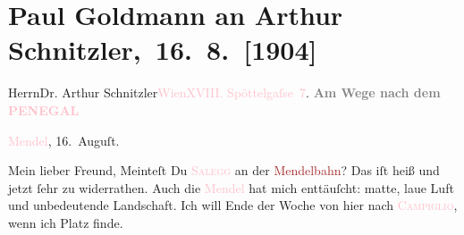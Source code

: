 

\renewcommand{\erwaehntePersonen}{Personen: Olga Schnitzler}
\renewcommand{\erwaehnteInstitutionen}{Institutionen: Mendelbahn}
\renewcommand{\erwaehnteOrte}{Orte: Edmund-Weiß-Gasse, Hotel Salegg, Madonna di Campiglio, Mende, Monte Penegal, Wien}
\renewcommand{\erwaehnteWerke}{}
\section[ Paul Goldmann an Arthur Schnitzler, 16. 8. {[}1904{]}]{Paul Goldmann an Arthur Schnitzler, 16. 8. {[}1904{]}}
\nopagebreak{}
\rehead{ }\normalsize\beginnumbering{}
\toendnotes[C]{\smallbreak\pagebreak[2]}
\toendnotes[C]{\smallbreak}\pstart{}{\pb}Herrn\pend{}\pstart{}Dr. Arthur Schnitzler\pend{}\pstart{}\textcolor{pink}{Wien}{}\ledrightnote{\textcolor{pink}{Wien}}\pend{}\pstart{}\textcolor{pink}{XVIII. Spöttelgaſse 7}{}\ledrightnote{\textcolor{pink}{Edmund-Weiß-Gasse}}.\pend{}
{\bigskip}
\pstart
           \noindent{}\centering{}{\pb}\textcolor{gray}{\textbf{Am Wege nach dem \textcolor{pink}{PENEGAL}{}\ledrightnote{\textcolor{pink}{Monte Penegal}}}}\pend
           
\pstart
           \textcolor{pink}{Mendel}{}\ledrightnote{\textcolor{pink}{Mende}}, 16. Auguſt.\pend
           
\pstart{}Mein lieber Freund,\pend
\pstart
           Meinteſt Du \textcolor{pink}{\textsc{Salegg}}{}\ledrightnote{\textcolor{pink}{Hotel Salegg}} an der \textcolor{brown}{Mendelbahn}{}\ledrightnote{\textcolor{brown}{Mendelbahn}}? Das iſt heiß und jetzt
               ſehr zu widerrathen. Auch die \textcolor{pink}{Mendel}{}\ledrightnote{\textcolor{pink}{Mende}} hat mich
               enttäuſcht: matte, laue Luft und unbedeutende Landschaft. Ich will Ende der Woche von
               hier nach \textcolor{pink}{\textsc{Campiglio}}{}\ledrightnote{\textcolor{pink}{Madonna di Campiglio}}, wenn ich Platz finde. \pend
           
